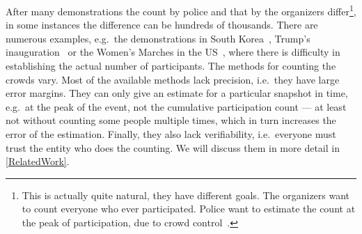 
After many demonstrations the count by police and that by the organizers 
differ\footnote{%
  This is actually quite natural, they have different goals.
  The organizers want to count everyone who ever participated.
  Police want to estimate the count at the peak of participation, due to crowd 
  control~\cite{2016DemonstrationsInSeoul}.
}, in some instances the difference can be hundreds of thousands.
There are numerous examples, e.g.\ the demonstrations in South 
Korea~\cite{2016DemonstrationsInSeoul}, Trump's 
inauguration~\cite{HowWillWeKnowTrumpInauguralCrowdSize} or the Women's Marches 
in the US~\cite{2017WomensMarchesInUS}, where there is difficulty in 
establishing the actual number of participants.
The methods for counting the crowds vary.
Most of the available methods lack precision, i.e.\ they have large error 
margins.
They can only give an estimate for a particular snapshot in time, e.g.\ at the 
peak of the event, not the cumulative participation count --- at least not 
without counting some people multiple times, which in turn increases the error 
of the estimation.
Finally, they also lack verifiability, i.e.\ everyone must trust the entity who
does the counting.
We will discuss them in more detail in \cref{RelatedWork}.

